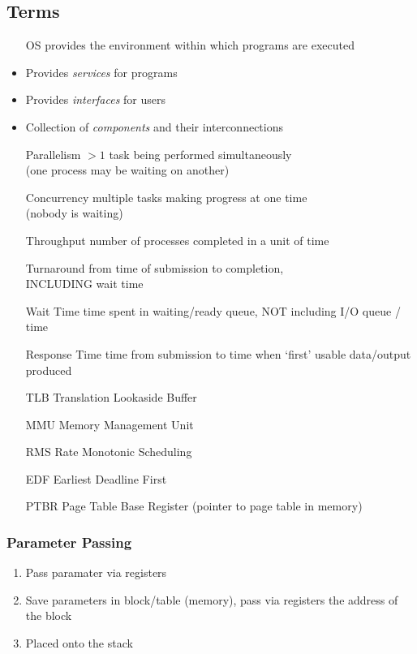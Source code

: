 \documentclass[a4paper]{article}
\newcommand{\resetsize}{\small}
\begin{document}
\begin{multicols*}{2}
    \resetsize
    \subsection*{Terms}
    \setlength{\leftmargini}{7em}
    \begin{itemize}
        \item[OS] provides the environment within which programs are executed
        \item Provides \emph{services} for programs
        \item Provides \emph{interfaces} for users
        \item Collection of \emph{components} and their interconnections
        \item[Parallelism] \(> 1\) task being performed simultaneously \\
            (one process may be waiting on another)
        \item[Concurrency] multiple tasks making progress at one time \\
            (nobody is waiting)
        \item[Throughput] number of processes completed in a unit of time
        \item[Turnaround] from time of submission to completion, \\
            INCLUDING wait time
        \item[Wait Time] time spent in waiting/ready queue, NOT including I/O queue / time
        \item[Response Time] time from submission to time when `first' usable data/output produced
        \item[TLB] Translation Lookaside Buffer
        \item[MMU] Memory Management Unit
        \item[RMS] Rate Monotonic Scheduling
        \item[EDF] Earliest Deadline First
        \item[PTBR] Page Table Base Register (pointer to page table in memory)
    \end{itemize}

    \subsubsection*{Parameter Passing}
    \setlength{\leftmargini}{2em}
    \begin{enumerate}
        \item Pass paramater via registers
        \item Save parameters in block/table (memory), pass via registers the
              address of the block
        \item Placed onto the stack
    \end{enumerate}

\end{multicols*}
\end{document}
